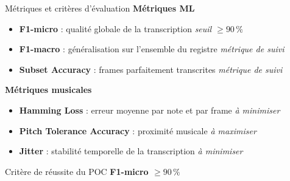 \begin{frame}{Métriques et critères d'évaluation}
	\textbf{Métriques ML}
	\begin{itemize}
		\item \textbf{F1-micro} : qualité globale de la transcription
		\hfill \textit{seuil $\geq 90\,\%$}
		
		\item \textbf{F1-macro} : généralisation sur l'ensemble du registre
		\hfill \textit{métrique de suivi}
		
		\item \textbf{Subset Accuracy} : frames parfaitement transcrites
		\hfill \textit{métrique de suivi}
	\end{itemize}
	
	\vspace{0.2cm}
	
	\textbf{Métriques musicales}
	\begin{itemize}
		\item \textbf{Hamming Loss} : erreur moyenne par note et par frame
		\hfill \textit{à minimiser}
		
		\item \textbf{Pitch Tolerance Accuracy} : proximité musicale
		\hfill \textit{à maximiser}
		
		\item \textbf{Jitter} : stabilité temporelle de la transcription
		\hfill \textit{à minimiser}
	\end{itemize}
	
	\vspace{0.2cm}
	
	\begin{block}{Critère de réussite du POC}
		\centering
		\textbf{F1-micro $\geq 90\,\%$}
	\end{block}
\end{frame}

